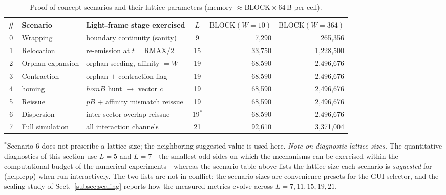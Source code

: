 \documentclass{ijuc}
\begin{document}
\begin{table}[h]
\centering
\caption{Proof-of-concept scenarios and their lattice parameters (memory $\approx\mathrm{BLOCK}\times64$\,B per cell).}
\label{tab:scenarios}
\begin{tabular}{|c|l|l|c|r|r|}
\hline
\# & Scenario & Light-frame stage exercised & $L$ & $\mathrm{BLOCK}(W{=}10)$ & $\mathrm{BLOCK}(W{=}364)$\\
\hline
0 & Wrapping & boundary continuity (sanity) & 9 & 7{,}290 & 265{,}356\\
1 & Relocation & re-emission at $t=\mathrm{RMAX}/2$ & 15 & 33{,}750 & 1{,}228{,}500\\
2 & Orphan expansion & orphan seeding, affinity $=W$ & 19 & 68{,}590 & 2{,}496{,}676\\
3 & Contraction & orphan $+$ contraction flag & 19 & 68{,}590 & 2{,}496{,}676\\
4 & homing & $homB$ hunt $\rightarrow$ vector $c$ & 19 & 68{,}590 & 2{,}496{,}676\\
5 & Reissue & $pB$ $+$ affinity mismatch reissue & 19 & 68{,}590 & 2{,}496{,}676\\
6 & Dispersion & inter-sector overlap reissue & 19$^{*}$ & 68{,}590 & 2{,}496{,}676\\
7 & Full simulation & all interaction channels & 21 & 92{,}610 & 3{,}371{,}004\\
\hline
\end{tabular}
{\small $^{*}$Scenario 6 does not prescribe a lattice size; the neighboring suggested value is used here.}
{\small \emph{Note on diagnostic lattice sizes.} The quantitative diagnostics of this section use $L=5$ and $L=7$---the smallest odd sides on which the mechanisms can be exercised within the computational budget of the numerical experiments---whereas the scenario table above lists the lattice size each scenario is \emph{suggested} for (help.cpp) when run interactively.  The two lists are not in conflict: the scenario sizes are convenience presets for the GUI selector, and the scaling study of Sect.~\ref{subsec:scaling} reports how the measured metrics evolve across $L=7,11,15,19,21$.}
\end{table}
\end{document}
